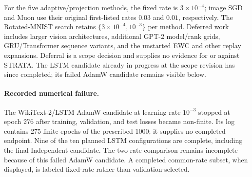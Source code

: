 For the five adaptive/projection methods, the fixed rate is $3\times10^{-4}$; image SGD and Muon use their original first-listed rates $0.03$ and $0.01$, respectively. The Rotated-MNIST search retains $\{3\times10^{-4},10^{-3}\}$ per method. Deferred work includes larger vision architectures, additional GPT-2 model/rank grids, GRU/Transformer sequence variants, and the unstarted EWC and other replay expansions. Deferral is a scope decision and supplies no evidence for or against STRATA. The LSTM candidate already in progress at the scope revision has since completed; its failed AdamW candidate remains visible below.

\paragraph{Recorded numerical failure.} The WikiText-2/LSTM AdamW candidate at learning rate $10^{-3}$ stopped at epoch 276 after training, validation, and test losses became non-finite. Its log contains 275 finite epochs of the prescribed 1000; it supplies no completed endpoint. Nine of the ten planned LSTM configurations are complete, including the final Independent candidate. The two-rate comparison remains incomplete because of this failed AdamW candidate. A completed common-rate subset, when displayed, is labeled fixed-rate rather than validation-selected.
